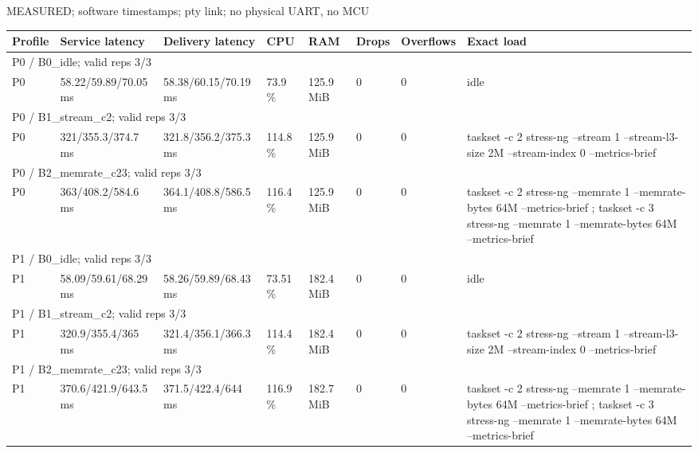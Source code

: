 \par\noindent MEASURED; software timestamps; pty link; no physical UART, no MCU\par
\begin{tabular}{llllllll}
\toprule
Profile & Service latency & Delivery latency & CPU & RAM & Drops & Overflows & Exact load \\
\midrule
\multicolumn{8}{l}{P0 / B0\_idle; valid reps 3/3} \\
P0 & 58.22/59.89/70.05 ms & 58.38/60.15/70.19 ms & 73.9 \% & 125.9 MiB & 0 & 0 & idle \\
\multicolumn{8}{l}{P0 / B1\_stream\_c2; valid reps 3/3} \\
P0 & 321/355.3/374.7 ms & 321.8/356.2/375.3 ms & 114.8 \% & 125.9 MiB & 0 & 0 & taskset -c 2 stress-ng --stream 1 --stream-l3-size 2M --stream-index 0 --metrics-brief \\
\multicolumn{8}{l}{P0 / B2\_memrate\_c23; valid reps 3/3} \\
P0 & 363/408.2/584.6 ms & 364.1/408.8/586.5 ms & 116.4 \% & 125.9 MiB & 0 & 0 & taskset -c 2 stress-ng --memrate 1 --memrate-bytes 64M --metrics-brief ; taskset -c 3 stress-ng --memrate 1 --memrate-bytes 64M --metrics-brief \\
\multicolumn{8}{l}{P1 / B0\_idle; valid reps 3/3} \\
P1 & 58.09/59.61/68.29 ms & 58.26/59.89/68.43 ms & 73.51 \% & 182.4 MiB & 0 & 0 & idle \\
\multicolumn{8}{l}{P1 / B1\_stream\_c2; valid reps 3/3} \\
P1 & 320.9/355.4/365 ms & 321.4/356.1/366.3 ms & 114.4 \% & 182.4 MiB & 0 & 0 & taskset -c 2 stress-ng --stream 1 --stream-l3-size 2M --stream-index 0 --metrics-brief \\
\multicolumn{8}{l}{P1 / B2\_memrate\_c23; valid reps 3/3} \\
P1 & 370.6/421.9/643.5 ms & 371.5/422.4/644 ms & 116.9 \% & 182.7 MiB & 0 & 0 & taskset -c 2 stress-ng --memrate 1 --memrate-bytes 64M --metrics-brief ; taskset -c 3 stress-ng --memrate 1 --memrate-bytes 64M --metrics-brief \\
\bottomrule
\end{tabular}

